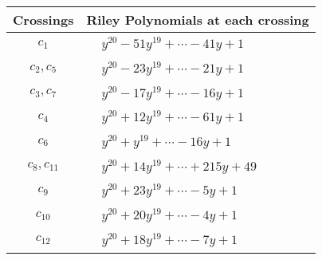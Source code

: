 \documentclass[1p]{elsarticle_modified}
\theoremstyle{definition}
\begin{document}
\begin{tabular}{m{50pt}|m{274pt}}
Crossings & \hspace{64pt}Riley Polynomials at each crossing \\
\hline $$\begin{aligned}c_{1}\end{aligned}$$&$\begin{aligned}
&y^{20}-51 y^{19}+\cdots-41 y+1
\end{aligned}$\\
\hline $$\begin{aligned}c_{2},c_{5}\end{aligned}$$&$\begin{aligned}
&y^{20}-23 y^{19}+\cdots-21 y+1
\end{aligned}$\\
\hline $$\begin{aligned}c_{3},c_{7}\end{aligned}$$&$\begin{aligned}
&y^{20}-17 y^{19}+\cdots-16 y+1
\end{aligned}$\\
\hline $$\begin{aligned}c_{4}\end{aligned}$$&$\begin{aligned}
&y^{20}+12 y^{19}+\cdots-61 y+1
\end{aligned}$\\
\hline $$\begin{aligned}c_{6}\end{aligned}$$&$\begin{aligned}
&y^{20}+y^{19}+\cdots-16 y+1
\end{aligned}$\\
\hline $$\begin{aligned}c_{8},c_{11}\end{aligned}$$&$\begin{aligned}
&y^{20}+14 y^{19}+\cdots+215 y+49
\end{aligned}$\\
\hline $$\begin{aligned}c_{9}\end{aligned}$$&$\begin{aligned}
&y^{20}+23 y^{19}+\cdots-5 y+1
\end{aligned}$\\
\hline $$\begin{aligned}c_{10}\end{aligned}$$&$\begin{aligned}
&y^{20}+20 y^{19}+\cdots-4 y+1
\end{aligned}$\\
\hline $$\begin{aligned}c_{12}\end{aligned}$$&$\begin{aligned}
&y^{20}+18 y^{19}+\cdots-7 y+1
\end{aligned}$\\
\hline
\end{tabular}\\~\\
\end{document}
